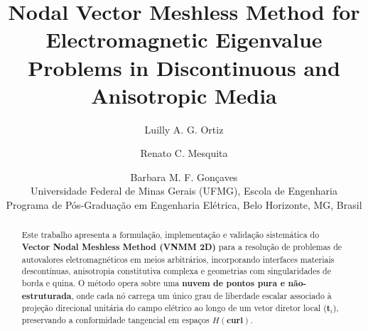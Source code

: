 \documentclass[11pt,a4paper]{article}
\title{\textbf{Nodal Vector Meshless Method for Electromagnetic Eigenvalue Problems in Discontinuous and Anisotropic Media}}
\author{
  Luilly A. G. Ortiz \and Renato C. Mesquita \and Barbara M. F. Gon\c{c}aves \\
  \small Universidade Federal de Minas Gerais (UFMG), Escola de Engenharia \\
  \small Programa de P\'os-Gradua\c{c}\~ao em Engenharia El\'etrica, Belo Horizonte, MG, Brasil
}
\date{}
\begin{document}
\maketitle

\begin{abstract}
Este trabalho apresenta a formula\c{c}\~ao, implementa\c{c}\~ao e valida\c{c}\~ao sistem\'atica do \textbf{Vector Nodal Meshless Method (VNMM 2D)} para a resolu\c{c}\~ao de problemas de autovalores eletromagn\'eticos em meios arbitr\'arios, incorporando interfaces materiais descont\'inuas, anisotropia constitutiva complexa e geometrias com singularidades de borda e quina. O m\'etodo opera sobre uma \textbf{nuvem de pontos pura e n\~ao-estruturada}, onde cada n\'o carrega um \'unico grau de liberdade escalar associado \`a proje\c{c}\~ao direcional unit\'aria do campo el\'etrico ao longo de um vetor diretor local ($\mathbf{t}_i$), preservando a conformidade tangencial em espa\c{c}os $H(\mathbf{curl})$.


\end{abstract}
\end{document}
